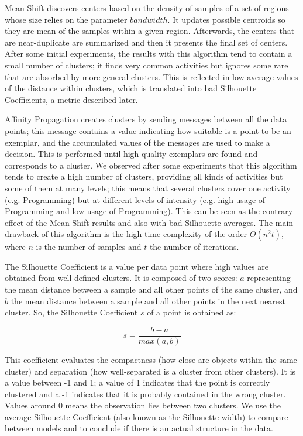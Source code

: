 Mean Shift \cite{CM02} discovers centers based on the density of samples of a set of regions whose size relies on the parameter $bandwidth$. It updates possible centroids so they are mean of the samples within a given region. Afterwards, the centers that are near-duplicate are summarized and then it presents the final set of centers. After some initial experiments, the results with this algorithm tend to contain a small number of clusters; it finds very common activities but ignores some rare that are absorbed by more general clusters. This is reflected in low average values of the distance within clusters, which is translated into bad Silhouette Coefficients, a metric described later.

Affinity Propagation \cite{FD07} creates clusters by sending messages between all the data points; this message contains a value indicating how suitable is a point to be an exemplar, and the accumulated values of the messages are used to make a decision. This is performed until high-quality exemplars are found and corresponds to a cluster. We observed after some experiments that this algorithm tends to create a high number of clusters, providing all kinds of activities but some of them at many levels; this means that several clusters cover one activity (e.g. Programming) but at different levels of intensity (e.g. high usage of Programming and low usage of Programming). This can be seen as the contrary effect of the Mean Shift results and also with bad Silhouette averages. The main drawback of this algorithm is the high time-complexity of the order $O(n^2t)$, where $n$ is the number of samples and $t$ the number of iterations.

The Silhouette Coefficient \cite{R87} is a value per data point where high values are obtained from well defined clusters. It is composed of two scores: $a$ representing the mean distance between a sample and all other points of the same cluster, and $b$ the mean distance between a sample and all other points in the next nearest cluster. So, the Silhouette Coefficient $s$ of a point is obtained as:

$$s = \frac{b-a}{max(a,b)}$$

This coefficient evaluates the compactness (how close are objects within the same cluster) and separation (how well-separated is a cluster from other clusters). It is a value between -1 and 1; a value of 1 indicates that the point is correctly clustered and a -1 indicates that it is probably contained in the wrong cluster. Values around 0 means the observation lies between two clusters. We use the average Silhouette Coefficient (also known as the Silhouette width) to compare between models and to conclude if there is an actual structure in the data.

